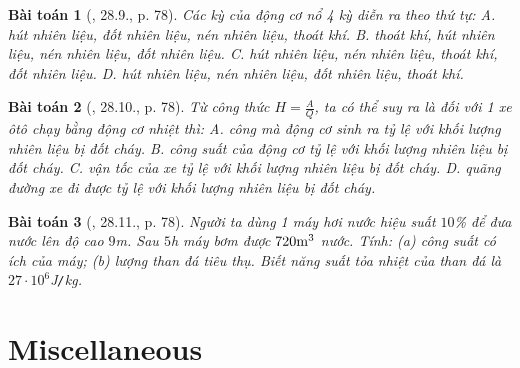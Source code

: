 \documentclass{article}
\newtheorem{baitoan}{Bài toán}
\begin{document}
\begin{baitoan}[\cite{SBT_Vat_Ly_8}, 28.9., p. 78]
	Các kỳ của động cơ nổ 4 kỳ diễn ra theo thứ tự: {\sf A.} hút nhiên liệu, đốt nhiên liệu, nén nhiên liệu, thoát khí. {\sf B.} thoát khí, hút nhiên liệu, nén nhiên liệu, đốt nhiên liệu. {\sf C.} hút nhiên liệu, nén nhiên liệu, thoát khí, đốt nhiên liệu. {\sf D.} hút nhiên liệu, nén nhiên liệu, đốt nhiên liệu, thoát khí.
\end{baitoan}

\begin{baitoan}[\cite{SBT_Vat_Ly_8}, 28.10., p. 78]
	Từ công thức $H = \frac{A}{Q}$, ta có thể suy ra là đối với 1 xe ôtô chạy bằng động cơ nhiệt thì: {\sf A.} công mà động cơ sinh ra tỷ lệ với khối lượng nhiên liệu bị đốt cháy. {\sf B.} công suất của động cơ tỷ lệ với khối lượng nhiên liệu bị đốt cháy. {\sf C.} vận tốc của xe tỷ lệ với khối lượng nhiên liệu bị đốt cháy. {\sf D.} quãng đường xe đi được tỷ lệ với khối lượng nhiên liệu bị đốt cháy.
\end{baitoan}

\begin{baitoan}[\cite{SBT_Vat_Ly_8}, 28.11., p. 78]
	Người ta dùng 1 máy hơi nước hiệu suất $10$\% để đưa nước lên độ cao $9$\emph{m}. Sau $5$\emph{h} máy bơm được $720\rm m^3$ nước. Tính: (a) công suất có ích của máy; (b) lượng than đá tiêu thụ. Biết năng suất tỏa nhiệt của than đá là $27\cdot10^6$\emph{J\texttt{/}kg}.
\end{baitoan}


\section{Miscellaneous}


\printbibliography[heading=bibintoc]
	
\end{document}
